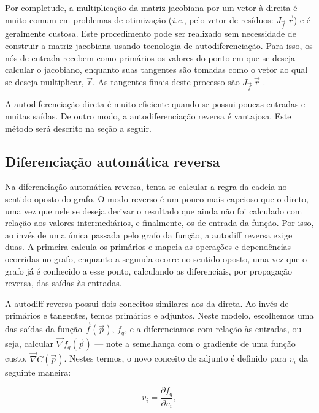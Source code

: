       Por completude, a multiplicação da matriz jacobiana por um vetor à direita é muito comum em problemas de otimização (\textit{i.e.}, pelo vetor de resíduos: $J_{\vec{f}}\ \vec{r}$) e é geralmente custosa. Este procedimento pode ser realizado sem necessidade de construir a matriz jacobiana usando tecnologia de autodiferenciação. Para isso, os nós de entrada recebem como primários os valores do ponto em que se deseja calcular o jacobiano, enquanto suas tangentes são tomadas como o vetor ao qual se deseja multiplicar, $\vec{r}$. As tangentes finais deste processo são $J_{\vec{f}}\ \vec{r}$ .

      A autodiferenciação direta é muito eficiente quando se possui poucas entradas e muitas saídas. De outro modo, a autodiferenciação reversa é vantajosa. Este método será descrito na seção a seguir.

    \subsection{Diferenciação automática reversa}

      Na diferenciação automática reversa, tenta-se calcular a regra da cadeia no sentido oposto do grafo. O modo reverso é um pouco mais capcioso que o direto, uma vez que nele se deseja derivar o resultado que ainda não foi calculado com relação aos valores intermediários, e finalmente, os de entrada da função. Por isso, ao invés de uma única passada pelo grafo da função, a autodiff reversa exige duas. A primeira calcula os primários e mapeia as operações e dependências ocorridas no grafo, enquanto a segunda ocorre no sentido oposto, uma vez que o grafo já é conhecido a esse ponto, calculando as diferenciais, por propagação reversa, das saídas às entradas.

      A autodiff reversa possui dois conceitos similares aos da direta. Ao invés de primários e tangentes, temos primários e adjuntos. Neste modelo, escolhemos uma das saídas da função $\vec{f}(\vec{p})$, $f_q$, e a diferenciamos com relação às entradas, ou seja, calcular $\vec{\nabla} f_q(\vec{p})$ --- note a semelhança com o gradiente de uma função custo, $\vec{\nabla} C(\vec{p})$. Nestes termos, o novo conceito de adjunto é definido para $v_i$ da seguinte maneira:

      \begin{equation} \label{e:autodiff_reversa_adjunto}
        \bar{v}_i = \frac{\partial f_q}{\partial v_i}
        ,
      \end{equation}

